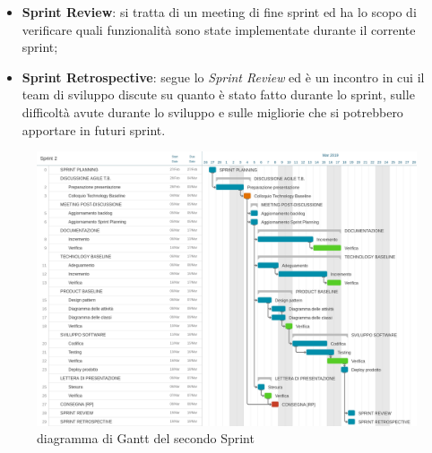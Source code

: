 \begin{itemize}
		\item \textbf{Sprint Review}: si tratta di un meeting di fine sprint ed ha lo scopo di verificare quali funzionalità sono state implementate durante il corrente sprint;
		\item \textbf{Sprint Retrospective}: segue lo \emph{Sprint Review} ed è un incontro in cui il team di sviluppo discute su quanto è stato fatto durante lo sprint, sulle difficoltà avute durante lo sviluppo e sulle migliorie che si potrebbero apportare in futuri sprint.  
	\end{itemize}
\begin{figure}[htbp]
	\centering
	\includegraphics[width=15cm,keepaspectratio]{../includes/pics/grafici/Sprint_2.jpeg}
	\caption{\label{fig:gantt-sprint2}diagramma di Gantt del secondo Sprint}
\end{figure}

\clearpage
